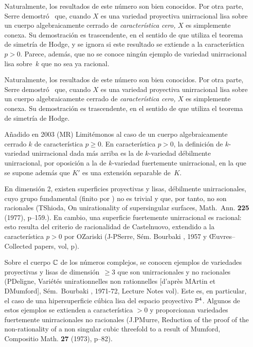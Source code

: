 {\begin{remarques}
\label{XI.1.4}
Naturalmente, los resultados de este número son bien conocidos. Por otra
parte,
%
Serre demostró~\cite{XI.10} que, cuando $X$ es una variedad proyectiva
unirracional lisa sobre un cuerpo algebraicamente cerrado de
\emph{característica cero,} $X$ es simplemente conexa. Su demostración es
trascendente, en el sentido de que utiliza el teorema de simetría de Hodge,
y se ignora si este resultado se extiende a la característica~$p>0$.
Parece, además, que no se conoce ningún ejemplo de variedad unirracional
lisa sobre~$k$ que no sea ya racional.
\end{remarques}}
{\begin{remarques}
\label{XI.1.4}
Naturalmente, los resultados de este número son bien conocidos. Por otra
parte,
%
Serre demostró~\cite{XI.10} que, cuando $X$ es una variedad proyectiva
unirracional lisa sobre un cuerpo algebraicamente cerrado de
\emph{característica cero,} $X$ es simplemente conexa. Su demostración es
trascendente, en el sentido de que utiliza el teorema de simetría de Hodge.

\lcrochetbf Añadido en 2003 (MR) Limitémonos al caso de un cuerpo
algebraicamente cerrado $k$ de característica $p\geq 0$. En característica
$p>0$, la definición de $k$-variedad unirracional dada más arriba es la de
$k$-variedad débilmente unirracional, por oposición a la de $k$-variedad
fuertemente unirracional, en la que se supone además que $K'$ es una
extensión separable de~$K$.

En dimensión $2$, existen superficies proyectivas y lisas, débilmente
unirracionales, cuyo grupo fundamental (finito por ) no es
trivial y que, por tanto, no son racionales (T\ptbl Shioda, On
unirationality of supersingular surfaces, Math.~Ann. \textbf{225} (1977),
p--159.). En cambio, una superficie fuertemente unirracional es
racional: esto resulta del criterio de racionalidad de Castelnuovo,
extendido a la característica $p>0$ por O\ptbl Zariski (\cf J-P\ptbl Serre,
Sém. Bourbaki , 1957 y {\OE}uvres--Collected papers, vol,
p).

Sobre el cuerpo $\mathbb C$ de los números complejos, se conocen ejemplos de
variedades proyectivas y lisas de \hbox{dimensión $\geq 3$} que son
unirracionales y no racionales (\cf P\ptbl Deligne, Variétés
unirationnelles non rationnelles [d'après M\ptbl Artin et D\ptbl Mumford],
Sém.\ Bourbaki , 1971-72, Lecture Notes vol). Este es, en
particular, el caso de una hipersuperficie cúbica lisa del espacio
proyectivo $\mathbb P^4$. Algunos de estos ejemplos se extienden a característica
$>0$ y proporcionan variedades fuertemente unirracionales no racionales
(\cf J.P\ptbl Murre, Reduction of the proof of the non-rationality of a non
singular cubic threefold to a result of Mumford, Compositio Math.
\textbf{27} (1973), p--82).


\end{remarques}}
